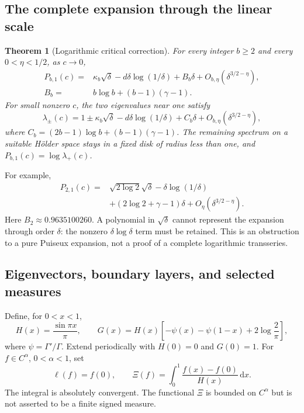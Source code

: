 \documentclass[11pt,a4paper]{article}
\numberwithin{equation}{section}
\newtheorem{theorem}{Theorem}[section]
\theoremstyle{definition}
\theoremstyle{remark}
\newcommand{\dd}{\,\mathrm d}
\begin{document}
\subsection{The complete expansion through the linear scale}
\begin{theorem}[Logarithmic critical correction]
\label{thm:pressure}
For every integer $b\ge2$ and every $0<\eta<1/2$, as $c\to0$,
\begin{equation}
 \boxed{\begin{aligned}
 P_{b,1}(c)={}&\kappa_b\sqrt\delta-d\delta\log(1/\delta)
                  +B_b\delta+O_{b,\eta}(\delta^{3/2-\eta}),\\
 B_b={}&b\log b+(b-1)(\gamma-1).
 \end{aligned}}
 \label{eq:main-pressure}
\end{equation}
For small nonzero $c$, the two eigenvalues near one satisfy
\begin{equation}
 \lambda_\pm(c)=1\pm\kappa_b\sqrt\delta-d\delta\log(1/\delta)
 +C_b\delta+O_{b,\eta}(\delta^{3/2-\eta}),
 \label{eq:eigenvalues-refined}
\end{equation}
where $C_b=(2b-1)\log b+(b-1)(\gamma-1)$.
The remaining spectrum on a suitable H\"older space stays in a fixed
disk of radius less than one, and $P_{b,1}(c)=\log\lambda_+(c)$.
\end{theorem}

For example,
\begin{equation}
\begin{split}
 P_{2,1}(c)={}&\sqrt{2\log2}\sqrt\delta-\delta\log(1/\delta)\\
 &+(2\log2+\gamma-1)\delta+O_\eta(\delta^{3/2-\eta}).
\end{split}
\label{eq:binary-expansion}
\end{equation}
Here $B_2\approx0.9635100260$. A polynomial in $\sqrt\delta$ cannot
represent the expansion through order $\delta$: the nonzero
$\delta\log\delta$ term must be retained. This is an obstruction to a
pure Puiseux expansion, not a proof of a complete logarithmic transseries.

\subsection{Eigenvectors, boundary layers, and selected measures}
Define, for $0<x<1$,
\begin{equation}
 H(x)=\frac{\sin\pi x}{\pi},\qquad
 G(x)=H(x)\left[-\psi(x)-\psi(1-x)+2\log\frac2\pi\right],
 \label{eq:HG}
\end{equation}
where $\psi=\Gamma'/\Gamma$. Extend periodically with $H(0)=0$ and
$G(0)=1$. For $f\in C^\alpha$, $0<\alpha<1$, set
\begin{equation}
 \ell(f)=f(0),\qquad
 \Xi(f)=\int_0^1\frac{f(x)-f(0)}{H(x)}\dd x.
 \label{eq:functionals}
\end{equation}
The integral is absolutely convergent. The functional $\Xi$ is bounded
on $C^\alpha$ but is not asserted to be a finite signed measure.
\end{document}
